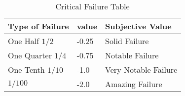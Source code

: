 \begin{table}[!h]
	\begin{tabular}{l|l|l}
	Type of Failure				& value & Subjective Value	\\
	\hline
	One Half \( 1/2 \)			& -0.25	& Solid Failure		\\
        One Quarter \( 1/4 \) 	& -0.75	& Notable Failure	\\
        One Tenth \( 1/10 \) 	& -1.0	& Very Notable Failure	\\
        \(1/100\) 				& -2.0	& Amazing Failure	\\
    \end{tabular}
	\caption{Critical Failure Table}\label{Table:CriticalFailure}
\end{table}

